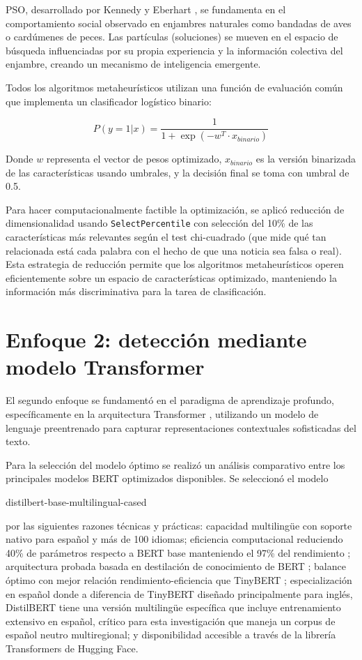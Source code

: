 PSO, desarrollado por Kennedy y Eberhart \cite{kennedy1995particle}, se fundamenta en el comportamiento social observado en enjambres naturales como bandadas de aves o cardúmenes de peces. Las partículas (soluciones) se mueven en el espacio de búsqueda influenciadas por su propia experiencia y la información colectiva del enjambre, creando un mecanismo de inteligencia emergente.

Todos los algoritmos metaheurísticos utilizan una función de evaluación común que implementa un clasificador logístico binario:

\begin{equation}
P(y=1|x) = \frac{1}{1 + \exp(-w^T \cdot x_{binario})}
\end{equation}

Donde $w$ representa el vector de pesos optimizado, $x_{binario}$ es la versión binarizada de las características usando umbrales, y la decisión final se toma con umbral de 0.5.

Para hacer computacionalmente factible la optimización, se aplicó reducción de dimensionalidad usando \texttt{SelectPercentile} con selección del 10\% de las características más relevantes según el test chi-cuadrado (que mide qué tan relacionada está cada palabra con el hecho de que una noticia sea falsa o real). Esta estrategia de reducción permite que los algoritmos metaheurísticos operen eficientemente sobre un espacio de características optimizado, manteniendo la información más discriminativa para la tarea de clasificación.

\section{Enfoque 2: detección mediante modelo Transformer}
\label{sec:enfoque_transformer}

El segundo enfoque se fundamentó en el paradigma de aprendizaje profundo, específicamente en la arquitectura Transformer \cite{vaswani2017attention}, utilizando un modelo de lenguaje preentrenado para capturar representaciones contextuales sofisticadas del texto.

Para la selección del modelo óptimo se realizó un análisis comparativo entre los principales modelos BERT optimizados disponibles. Se seleccionó el modelo {\sloppy\ttfamily distilbert-base-multilingual-cased\par} por las siguientes razones técnicas y prácticas: capacidad multilingüe con soporte nativo para español y más de 100 idiomas; eficiencia computacional reduciendo 40\% de parámetros respecto a BERT base manteniendo el 97\% del rendimiento \cite{sanh2019distilbert}; arquitectura probada basada en destilación de conocimiento de BERT \cite{devlin2018bert}; balance óptimo con mejor relación rendimiento-eficiencia que TinyBERT \cite{jiao2019tinybert}; especialización en español donde a diferencia de TinyBERT diseñado principalmente para inglés, DistilBERT tiene una versión multilingüe específica que incluye entrenamiento extensivo en español, crítico para esta investigación que maneja un corpus de español neutro multiregional; y disponibilidad accesible a través de la librería Transformers de Hugging Face.

